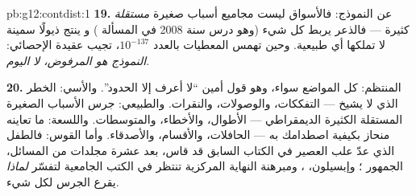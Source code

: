 \begin{solution}{pb:g12:contdist:1}
\textbf{19.} عن النموذج: فالأسواق ليست مجاميع أسباب
صغيرة \emph{مستقلة} كثيرة --- فالذعر يربط
كل شيء (وهو درس سنة 2008 في المسألة ) و
ينتج ذيولًا سمينة لا تملكها أي  طبيعية. وحين تهمس المعطيات
بالعدد $10^{-137}$، تجيب عقيدة الإحصائي:
\emph{النموذج هو المرفوض، لا اليوم}.

\textbf{20.} المنتظم: كل المواضع سواء، وهو قول أمين ``لا
أعرف إلا الحدود''. والأسي: الخطر الذي لا
يشيخ --- التفككات، والوصولات، والنقرات. والطبيعي: جرس
الأسباب الصغيرة المستقلة الكثيرة الديمقراطي --- الأطوال، والأخطاء،
والمتوسطات. واللسعة: ما تعاينه منحاز بكيفية اصطدامك
به --- الحافلات، والأقسام، والأصدقاء. وأما القوس: فالطفل
الذي عدّ علب العصير في الكتاب السابق قد قاس، بعد عشرة مجلدات
من المسائل، الجمهور ؛ وإبسيلون،
، ومبرهنة النهاية المركزية تنتظر في الكتب
الجامعية لتفسّر \emph{لماذا} يقرع الجرس
لكل شيء.
\end{solution}
